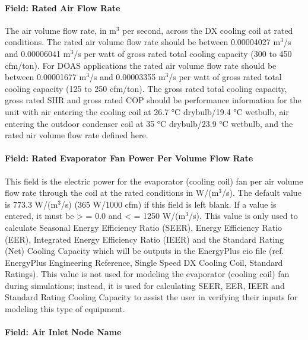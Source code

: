 \paragraph{Field: Rated Air Flow Rate}\label{field-rated-air-flow-rate-2}

The air volume flow rate, in m\(^{3}\) per second, across the DX cooling coil at rated conditions. The rated air volume flow rate should be between 0.00004027 m\(^{3}\)/s and 0.00006041 m\(^{3}\)/s per watt of gross rated total cooling capacity (300 to 450 cfm/ton). For DOAS applications the rated air volume flow rate should be between 0.00001677 m\(^{3}\)/s and 0.00003355 m\(^{3}\)/s per watt of gross rated total cooling capacity (125 to 250 cfm/ton). The gross rated total cooling capacity, gross rated SHR and gross rated COP should be performance information for the unit with air entering the cooling coil at 26.7 °C drybulb/19.4 °C wetbulb, air entering the outdoor condenser coil at 35 °C drybulb/23.9 °C wetbulb, and the rated air volume flow rate defined here.

\paragraph{Field: Rated Evaporator Fan Power Per Volume Flow Rate}\label{field-rated-evaporator-fan-power-per-volume-flow-rate}

This field is the electric power for the evaporator (cooling coil) fan per air volume flow rate through the coil at the rated conditions in W/(m\(^{3}\)/s). The default value is 773.3 W/(m\(^{3}\)/s) (365 W/1000 cfm) if this field is left blank. If a value is entered, it must be \textgreater{} = 0.0 and \textless{} = 1250 W/(m\(^{3}\)/s). This value is only used to calculate Seasonal Energy Efficiency Ratio (SEER), Energy Efficiency Ratio (EER), Integrated Energy Efficiency Ratio (IEER) and the Standard Rating (Net) Cooling Capacity which will be outputs in the EnergyPlus eio file (ref. EnergyPlus Engineering Reference, Single Speed DX Cooling Coil, Standard Ratings). This value is not used for modeling the evaporator (cooling coil) fan during simulations; instead, it is used for calculating SEER, EER, IEER and Standard Rating Cooling Capacity to assist the user in verifying their inputs for modeling this type of equipment.

\paragraph{Field: Air Inlet Node Name}\label{field-air-inlet-node-name-9}

